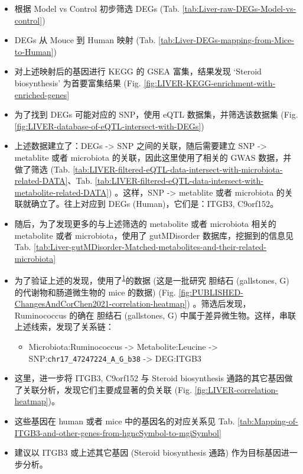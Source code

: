 \documentclass[
]{article}
\providecommand{\tightlist}{%
  \setlength{\itemsep}{0pt}\setlength{\parskip}{0pt}}
\begin{document}
\begin{itemize}
\tightlist
\item
  根据 Model vs Control 初步筛选 DEGs (Tab. \ref{tab:Liver-raw-DEGs-Model-vs-control})
\item
  DEGs 从 Mouce 到 Human 映射 (Tab. \ref{tab:Liver-DEGs-mapping-from-Mice-to-Human})
\item
  对上述映射后的基因进行 KEGG 的 GSEA 富集，结果发现 `Steroid biosynthesis' 为首要富集结果 (Fig. \ref{fig:LIVER-KEGG-enrichment-with-enriched-genes}
\item
  为了找到 DEGs 可能对应的 SNP，使用 eQTL 数据集，并筛选该数据集 (Fig. \ref{fig:LIVER-database-of-eQTL-intersect-with-DEGs})\\
\item
  上述数据建立了：DEGs -\textgreater{} SNP 之间的关联，随后需要建立 SNP -\textgreater{} metablite 或者 microbiota 的关联，因此这里使用了相关的 GWAS 数据，并做了筛选 (Tab. \ref{tab:LIVER-filtered-eQTL-data-intersect-with-microbiota-related-DATA}、Tab. \ref{tab:LIVER-filtered-eQTL-data-intersect-with-metabolite-related-DATA}) 。这样，SNP -\textgreater{} metablite 或者 microbiota 的关联就确立了。往上对应到 DEGs (Human)，它们是：ITGB3, C9orf152。
\item
  随后，为了发现更多的与上述筛选的 metabolite 或者 microbiota 相关的 metabolite 或者 microbiota，使用了 gutMDisorder 数据库，挖掘到的信息见 Tab. \ref{tab:Liver-gutMDisorder-Matched-metabolites-and-their-related-microbiota}
\item
  为了验证上述的发现，使用了\textsuperscript{\protect\hyperlink{ref-ChangesAndCorChen2021}{1}}的数据 (这是一批研究 胆结石 (gallstones, G) 的代谢物和肠道微生物的 mice 的数据) (Fig. \ref{fig:PUBLISHED-ChangesAndCorChen2021-correlation-heatmap}) 。筛选后发现，Ruminococcus 的确在 胆结石 (gallstones, G) 中属于差异微生物。这样，串联上述线索，发现了关系链：

  \begin{itemize}
  \tightlist
  \item
    Microbiota:Ruminococcus -\textgreater{} Metabolite:Leucine -\textgreater{} SNP:\texttt{chr17\_47247224\_A\_G\_b38} -\textgreater{} DEG:ITGB3
  \end{itemize}
\item
  这里，进一步将 ITGB3, C9orf152 与 Steroid biosynthesis 通路的其它基因做了关联分析，发现它们主要成显著的负关联 (Fig. \ref{fig:LIVER-correlation-heatmap})。
\item
  这些基因在 human 或者 mice 中的基因名的对应关系见 Tab. \ref{tab:Mapping-of-ITGB3-and-other-genes-from-hgncSymbol-to-mgiSymbol}
\item
  建议以 ITGB3 或上述其它基因 (Steroid biosynthesis 通路) 作为目标基因进一步分析。
\end{itemize}
\end{document}
